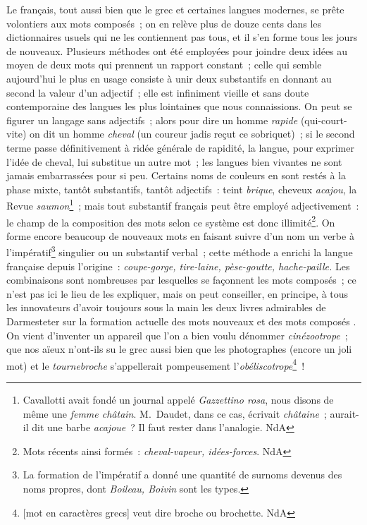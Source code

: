 \documentclass[french,twoside]{book} %
\begin{document}
Le français, tout aussi bien que le grec et certaines langues modernes, se prête volontiers aux mots composés ; on en relève plus de douze cents dans les dictionnaires usuels qui ne les contiennent pas tous, et il s’en forme tous les jours de nouveaux. Plusieurs méthodes ont été employées pour joindre deux idées au moyen de deux mots qui prennent un rapport constant ; celle qui semble aujourd’hui le plus en usage consiste à unir deux substantifs en donnant au second la valeur d’un adjectif ; elle est infiniment vieille et sans doute contemporaine des langues les plus lointaines que nous connaissions. On peut se figurer un langage sans adjectifs ; alors pour dire un homme {\itshape rapide} (qui-court-vite) on dit un homme {\itshape cheval} (un coureur jadis reçut ce sobriquet) ; si le second terme passe définitivement à ridée générale de rapidité, la langue, pour exprimer l’idée de cheval, lui substitue un autre mot ; les langues bien vivantes ne sont jamais embarrassées pour si peu. Certains noms de couleurs en sont restés à la phase mixte, tantôt substantifs, tantôt adjectifs : teint {\itshape brique}, cheveux {\itshape acajou}, la Revue {\itshape saumon}\footnote{Cavallotti avait fondé un journal appelé {\itshape Gazzettino rosa}, nous disons de même une {\itshape femme châtain}. M. Daudet, dans ce cas, écrivait {\itshape châtaine} ; aurait-il dit une barbe {\itshape acajoue} ? Il faut rester dans l’analogie. NdA} ; mais tout substantif français peut être employé adjectivement : le champ de la composition des mots selon ce système est donc illimité\footnote{Mots récents ainsi formés : {\itshape cheval-vapeur, idées-forces}. NdA}. On forme encore beaucoup de nouveaux mots en faisant suivre d’un nom un verbe à l’impératif\footnote{La formation de l’impératif a donné une quantité de surnoms devenus des noms propres, dont {\itshape Boileau, Boivin} sont les types.} singulier ou un substantif verbal ; cette méthode a enrichi la langue française depuis l’origine : {\itshape coupe-gorge, tire-laine, pèse-goutte, hache-paille.} Les combinaisons sont nombreuses par lesquelles se façonnent les mots composés ; ce n’est pas ici le lieu de les expliquer, mais on peut conseiller, en principe, à tous les innovateurs d’avoir toujours sous la main les deux livres admirables de Darmesteter sur la formation actuelle des mots nouveaux et des mots composés . On vient d’inventer un appareil que l’on a bien voulu dénommer {\itshape cinézootrope} ; que nos aïeux n’ont-ils su le grec aussi bien que les photographes (encore un joli mot) et le {\itshape tournebroche} s’appellerait pompeusement l’{\itshape obéliscotrope}\footnote{[mot en caractères grecs] veut dire broche ou brochette. NdA} !\par
\end{document}
